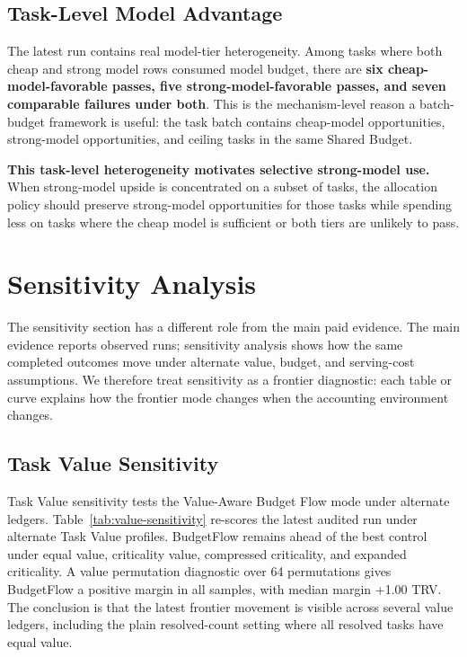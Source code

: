 \documentclass{article}
\newcommand{\method}{BudgetFlow\xspace}
\newcommand{\trv}{TRV\xspace}
\newcommand{\sharedbudget}{Shared Budget\xspace}
\begin{document}
\subsection{Task-Level Model Advantage}
The latest run contains real model-tier heterogeneity. Among tasks where both cheap and strong model rows consumed model budget, there are \textbf{six cheap-model-favorable passes, five strong-model-favorable passes, and seven comparable failures under both}. This is the mechanism-level reason a batch-budget framework is useful: the task batch contains cheap-model opportunities, strong-model opportunities, and ceiling tasks in the same \sharedbudget.

\textbf{This task-level heterogeneity motivates selective strong-model use.} When strong-model upside is concentrated on a subset of tasks, the allocation policy should preserve strong-model opportunities for those tasks while spending less on tasks where the cheap model is sufficient or both tiers are unlikely to pass.

\section{Sensitivity Analysis}
\label{sec:sensitivity}
The sensitivity section has a different role from the main paid evidence. The main evidence reports observed runs; sensitivity analysis shows how the same completed outcomes move under alternate value, budget, and serving-cost assumptions. We therefore treat sensitivity as a frontier diagnostic: each table or curve explains how the frontier mode changes when the accounting environment changes.

\subsection{Task Value Sensitivity}
Task Value sensitivity tests the Value-Aware Budget Flow mode under alternate ledgers. Table~\ref{tab:value-sensitivity} re-scores the latest audited run under alternate Task Value profiles. \method remains ahead of the best control under equal value, criticality value, compressed criticality, and expanded criticality. A value permutation diagnostic over 64 permutations gives \method a positive margin in all samples, with median margin +1.00 \trv. The conclusion is that the latest frontier movement is visible across several value ledgers, including the plain resolved-count setting where all resolved tasks have equal value.
\end{document}
